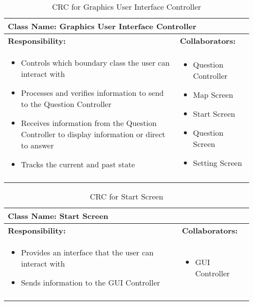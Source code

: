 \documentclass[titlepage]{article}
\begin{document}
\newpage	
	\begin{longtable}{| p{} | p{} |}
			\hline
			 \multicolumn{2}{|l|}{\textbf{Class Name: Graphics User Interface Controller}} \\
			\hline
			\textbf{Responsibility:} & \textbf{Collaborators:} \\
			\hline
				\begin{itemize}
					\item Controls which boundary class the user can interact with
					\item Processes and verifies information to send to the Question Controller
					\item Receives information from the Question Controller to display information or direct to answer
					\item Tracks the current and past state
				\end{itemize} & 
				\begin{itemize}
					\item Question Controller
					\item Map Screen
					\item Start Screen
					\item Question Screen
					\item Setting Screen
				\end{itemize} 
				\\
			\hline
		\caption{CRC for Graphics User Interface Controller}
	\end{longtable}
	
	\begin{longtable}{| p{} | p{} |}
			\hline
			 \multicolumn{2}{|l|}{\textbf{Class Name: Start Screen}} \\
			\hline
			\textbf{Responsibility:} & \textbf{Collaborators:} \\
			\hline
				\begin{itemize}
					\item Provides an interface that the user can interact with
					\item Sends information to the GUI Controller
				\end{itemize} & 
				\begin{itemize}
					\item GUI Controller
				\end{itemize} 
				\\
			\hline
		\caption{CRC for Start Screen}
	\end{longtable}
	
\end{document}
